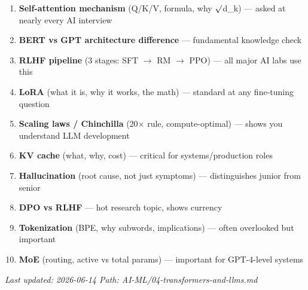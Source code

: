 \documentclass[11pt]{article}
\providecommand{\tightlist}{\setlength{\itemsep}{1pt}\setlength{\parskip}{0pt}}
\begin{document}
\begin{enumerate}
\def\labelenumi{\arabic{enumi}.}
\tightlist
\item
  \textbf{Self-attention mechanism} (Q/K/V, formula, why \(\surd\)d\_k) --- asked at nearly every AI interview
\item
  \textbf{BERT vs GPT architecture difference} --- fundamental knowledge check
\item
  \textbf{RLHF pipeline} (3 stages: SFT \(\rightarrow\) RM \(\rightarrow\) PPO) --- all major AI labs use this
\item
  \textbf{LoRA} (what it is, why it works, the math) --- standard at any fine-tuning question
\item
  \textbf{Scaling laws / Chinchilla} (20\(\times\) rule, compute-optimal) --- shows you understand LLM development
\item
  \textbf{KV cache} (what, why, cost) --- critical for systems/production roles
\item
  \textbf{Hallucination} (root cause, not just symptoms) --- distinguishes junior from senior
\item
  \textbf{DPO vs RLHF} --- hot research topic, shows currency
\item
  \textbf{Tokenization} (BPE, why subwords, implications) --- often overlooked but important
\item
  \textbf{MoE} (routing, active vs total params) --- important for GPT-4-level systems
\end{enumerate}

\emph{Last updated: 2026-06-14 \textbar{} Path: AI-ML/04-transformers-and-llms.md}
\end{document}
